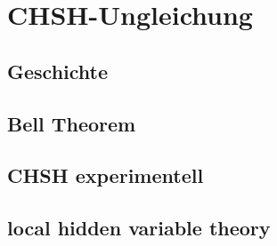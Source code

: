 \section{CHSH-Ungleichung}
\label{sec:chsh}


\subsection{Geschichte}
\label{subsec:chsh_geschichte}


\subsection{Bell Theorem}
\label{subsec:chsh_bell_theorem}


\subsection{CHSH experimentell}
\label{subsec:chsh_experimentell}


\subsection{local hidden variable theory}
\label{subsec:chsh_lhvt}
